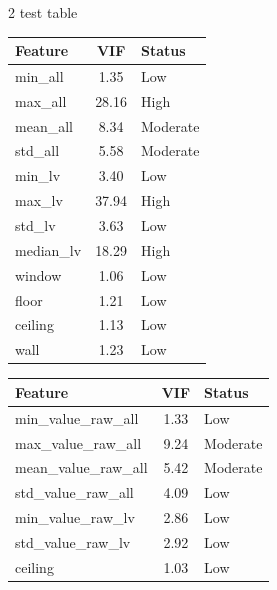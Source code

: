 \documentclass[11pt,a4paper]{article}
\begin{document}
\begin{multicols}{2}
test table
\begin{center}
\begin{tabular}{l|c|l}
\hline
Feature & VIF & Status \\
\hline
min\_all & 1.35 & Low \\
max\_all & 28.16 & High \\
mean\_all & 8.34 & Moderate \\
std\_all & 5.58 & Moderate \\
min\_lv & 3.40 & Low \\
max\_lv & 37.94 & High \\
std\_lv & 3.63 & Low \\
median\_lv & 18.29 & High \\
window & 1.06 & Low \\
floor & 1.21 & Low \\
ceiling & 1.13 & Low \\
wall & 1.23 & Low \\
\hline
\end{tabular}
\label{tab:vif_analysis}
\end{center}

\vspace{10em}

\begin{center}
\begin{tabular}{l|c|l}
\hline
Feature & VIF & Status \\
\hline
min\_value\_raw\_all & 1.33 & Low \\
max\_value\_raw\_all & 9.24 & Moderate \\
mean\_value\_raw\_all & 5.42 & Moderate \\
std\_value\_raw\_all & 4.09 & Low \\
min\_value\_raw\_lv & 2.86 & Low \\
std\_value\_raw\_lv & 2.92 & Low \\
ceiling & 1.03 & Low \\
\hline
\end{tabular}
\label{tab:vif_analysis_updated}
\end{center}





\end{multicols}
\end{document}

